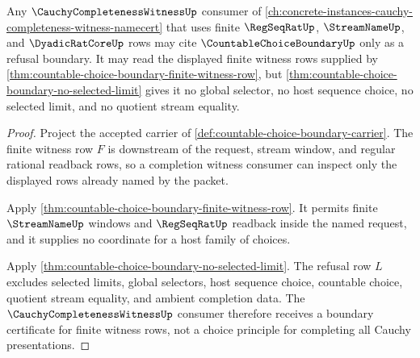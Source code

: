 \begin{theorem}
\label{thm:countable-choice-boundary-cauchy-witness-refusal}
Any $\CauchyCompletenessWitnessUp$ consumer of \autoref{ch:concrete-instances-cauchy-completeness-witness-namecert} that uses finite $\RegSeqRatUp$, $\StreamNameUp$, and $\DyadicRatCoreUp$ rows may cite $\CountableChoiceBoundaryUp$ only as a refusal boundary. It may read the displayed finite witness rows supplied by \autoref{thm:countable-choice-boundary-finite-witness-row}, but \autoref{thm:countable-choice-boundary-no-selected-limit} gives it no global selector, no host sequence choice, no selected limit, and no quotient stream equality.
\end{theorem}
\begin{proof}
Project the accepted carrier of \autoref{def:countable-choice-boundary-carrier}. The finite witness row $F$ is downstream of the request, stream window, and regular rational readback rows, so a completion witness consumer can inspect only the displayed rows already named by the packet.

Apply \autoref{thm:countable-choice-boundary-finite-witness-row}. It permits finite $\StreamNameUp$ windows and $\RegSeqRatUp$ readback inside the named request, and it supplies no coordinate for a host family of choices.

Apply \autoref{thm:countable-choice-boundary-no-selected-limit}. The refusal row $L$ excludes selected limits, global selectors, host sequence choice, countable choice, quotient stream equality, and ambient completion data. The $\CauchyCompletenessWitnessUp$ consumer therefore receives a boundary certificate for finite witness rows, not a choice principle for completing all Cauchy presentations.
\end{proof}


